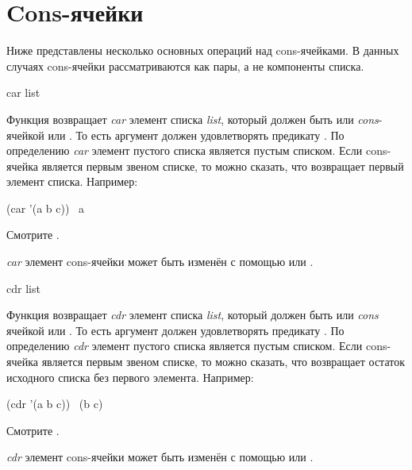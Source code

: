 \section{Cons-ячейки}

Ниже представлены несколько основных операций над cons-ячейками. В данных
случаях cons-ячейки рассматриваются как пары, а не компоненты списка.

\begin{defun}[Функция]
car list

Функция возвращает \emph{car} элемент списка \emph{list}, который должен быть
или \emph{cons}-ячейкой или {\emptylist}. То есть аргумент должен удовлетворять
предикату .
По определению \emph{car} элемент пустого списка является пустым списком.
Если cons-ячейка является первым звеном списке, то можно сказать, что 
возвращает первый элемент списка.
Например:
\begin{lisp}
(car '(a b c)) \EV\ a
\end{lisp}
Смотрите .

\emph{car} элемент cons-ячейки может быть изменён с помощью  или
.
\end{defun}

\begin{defun}[Функция]
cdr list

Функция возвращает \emph{cdr} элемент списка \emph{list}, который должен быть
или \emph{cons} ячейкой или {\emptylist}. То есть аргумент должен удовлетворять
предикату .
По определению \emph{cdr} элемент пустого списка является пустым списком.
Если cons-ячейка является первым звеном списке, то можно сказать, что 
возвращает остаток исходного списка без первого элемента.
Например:
\begin{lisp}
(cdr '(a b c)) \EV\ (b c)
\end{lisp}
Смотрите .

\emph{cdr} элемент cons-ячейки может быть изменён с помощью  или
.
\end{defun}

